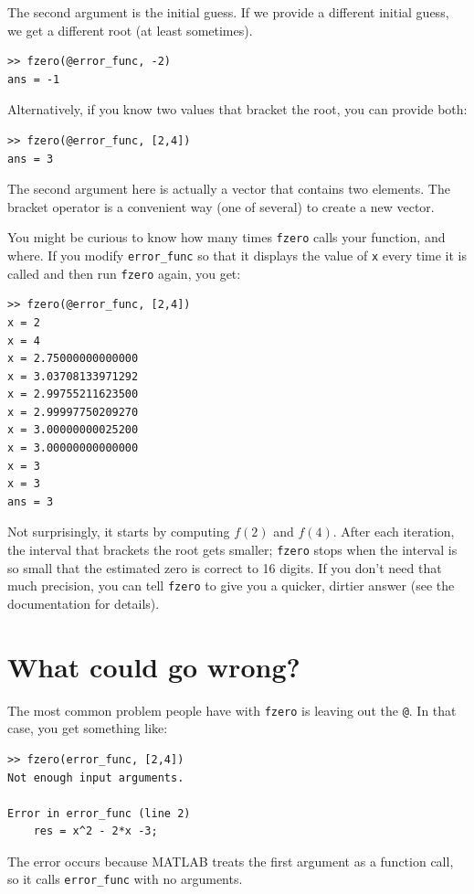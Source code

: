 \documentclass[
]{book}
\begin{document}
The second argument is the initial guess.  If we provide a different
initial guess, we get a different root (at least sometimes).

\begin{verbatim}
>> fzero(@error_func, -2)
ans = -1
\end{verbatim}

Alternatively, if you know two values that bracket the root,
you can provide both:

\begin{verbatim}
>> fzero(@error_func, [2,4])
ans = 3
\end{verbatim}

The second argument here is actually a vector that contains two
elements.  The bracket operator is a convenient way (one of several)
to create a new vector.

You might be curious to know how many times {\tt fzero} calls your
function, and where.  If you modify {\tt error\_func} so that it displays
the value of {\tt x} every time it is called and then run {\tt fzero}
again, you get:

\begin{verbatim}
>> fzero(@error_func, [2,4])
x = 2
x = 4
x = 2.75000000000000
x = 3.03708133971292
x = 2.99755211623500
x = 2.99997750209270
x = 3.00000000025200
x = 3.00000000000000
x = 3
x = 3
ans = 3
\end{verbatim}

Not surprisingly, it starts by computing $f(2)$ and $f(4)$.  After
each iteration, the interval that brackets the root gets smaller;
{\tt fzero} stops when the interval is so small that the estimated
zero is correct to 16 digits.  If you
don't need that much precision, you can tell {\tt fzero} to give
you a quicker, dirtier answer (see the documentation for details).


\section{What could go wrong?}

The most common problem people have with {\tt fzero} is leaving
out the {\tt @}.  In that case, you get something like:

\begin{verbatim}
>> fzero(error_func, [2,4])
Not enough input arguments.

Error in error_func (line 2)
    res = x^2 - 2*x -3;
\end{verbatim}

The error occurs because MATLAB treats the first argument as a function call,
so it calls {\tt error\_func} with no arguments.
\end{document}

